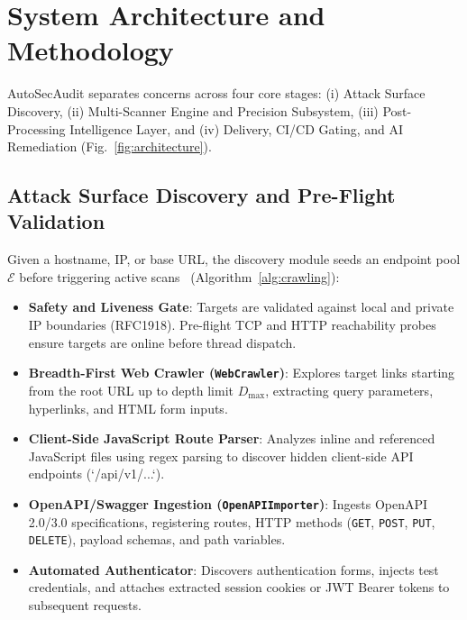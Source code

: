 \documentclass[conference]{IEEEtran}
\begin{document}
\section{System Architecture and Methodology}
AutoSecAudit separates concerns across four core stages: (i) Attack Surface Discovery, (ii) Multi-Scanner Engine and Precision Subsystem, (iii) Post-Processing Intelligence Layer, and (iv) Delivery, CI/CD Gating, and AI Remediation (Fig.~\ref{fig:architecture}).

\subsection{Attack Surface Discovery and Pre-Flight Validation}
Given a hostname, IP, or base URL, the discovery module seeds an endpoint pool $\mathcal{E}$ before triggering active scans~\cite{doupe2012enemy,atlidakis2019restler} (Algorithm~\ref{alg:crawling}):
\begin{itemize}
    \item \textbf{Safety and Liveness Gate}: Targets are validated against local and private IP boundaries (RFC1918). Pre-flight TCP and HTTP reachability probes ensure targets are online before thread dispatch.
    \item \textbf{Breadth-First Web Crawler (\texttt{WebCrawler})}: Explores target links starting from the root URL up to depth limit $D_{\max}$, extracting query parameters, hyperlinks, and HTML form inputs.
    \item \textbf{Client-Side JavaScript Route Parser}: Analyzes inline and referenced JavaScript files using regex parsing to discover hidden client-side API endpoints (`/api/v1/...`).
    \item \textbf{OpenAPI/Swagger Ingestion (\texttt{OpenAPIImporter})}: Ingests OpenAPI 2.0/3.0 specifications, registering routes, HTTP methods (\texttt{GET}, \texttt{POST}, \texttt{PUT}, \texttt{DELETE}), payload schemas, and path variables.
    \item \textbf{Automated Authenticator}: Discovers authentication forms, injects test credentials, and attaches extracted session cookies or JWT Bearer tokens to subsequent requests.
\end{itemize}
\end{document}
